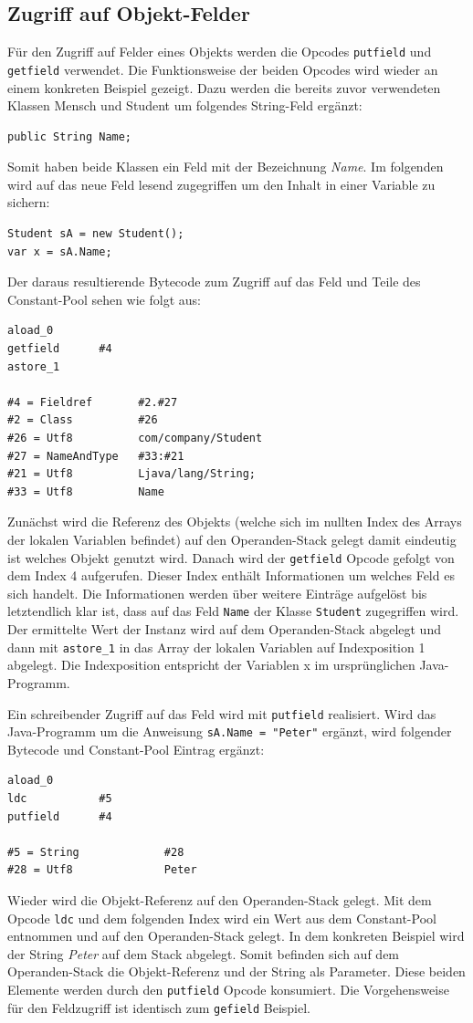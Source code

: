 \documentclass[conference]{IEEEtran}
\begin{document}
\subsection{Zugriff auf Objekt-Felder}
Für den Zugriff auf Felder eines Objekts werden die Opcodes \verb|putfield| und \verb|getfield| verwendet. Die Funktionsweise der beiden Opcodes wird wieder an einem konkreten Beispiel gezeigt. Dazu werden die bereits zuvor verwendeten Klassen Mensch und Student um folgendes String-Feld ergänzt:
\begin{lstlisting}
public String Name;
\end{lstlisting}
Somit haben beide Klassen ein Feld mit der Bezeichnung \textit{Name}. Im folgenden wird auf das neue Feld lesend zugegriffen um den Inhalt in einer Variable zu sichern:
\begin{lstlisting}
Student sA = new Student();
var x = sA.Name;
\end{lstlisting}
Der daraus resultierende Bytecode zum Zugriff auf das Feld und Teile des Constant-Pool sehen wie folgt aus:
\begin{lstlisting}
aload_0
getfield      #4
astore_1

#4 = Fieldref       #2.#27         
#2 = Class          #26   
#26 = Utf8          com/company/Student         
#27 = NameAndType   #33:#21        
#21 = Utf8          Ljava/lang/String;
#33 = Utf8          Name
\end{lstlisting}
Zunächst wird die Referenz des Objekts (welche sich im nullten Index des Arrays der lokalen Variablen befindet) auf den Operanden-Stack gelegt damit eindeutig ist welches Objekt genutzt wird. Danach wird der \verb|getfield| Opcode gefolgt von dem Index 4 aufgerufen. Dieser Index enthält Informationen um welches Feld es sich handelt. Die Informationen werden über weitere Einträge aufgelöst bis letztendlich klar ist, dass auf das Feld \verb|Name| der Klasse \verb|Student| zugegriffen wird. Der ermittelte Wert der Instanz wird auf dem Operanden-Stack abgelegt und dann mit \verb|astore_1| in das Array der lokalen Variablen auf Indexposition 1 abgelegt. Die Indexposition entspricht der Variablen x im ursprünglichen Java-Programm.

Ein schreibender Zugriff auf das Feld wird mit \verb|putfield| realisiert. Wird das Java-Programm um die Anweisung \verb|sA.Name = "Peter"| ergänzt, wird folgender Bytecode und Constant-Pool Eintrag ergänzt:
\begin{lstlisting}
aload_0
ldc           #5
putfield      #4

#5 = String             #28
#28 = Utf8              Peter
\end{lstlisting}
Wieder wird die Objekt-Referenz auf den Operanden-Stack gelegt. Mit dem Opcode \verb|ldc| und dem folgenden Index wird ein Wert aus dem Constant-Pool entnommen und auf den Operanden-Stack gelegt. In dem konkreten Beispiel wird der String \textit{Peter} auf dem Stack abgelegt. Somit befinden sich auf dem Operanden-Stack die Objekt-Referenz und der String als Parameter. Diese beiden Elemente werden durch den \verb|putfield| Opcode konsumiert. Die Vorgehensweise für den Feldzugriff ist identisch zum \verb|gefield| Beispiel. 
\end{document}
